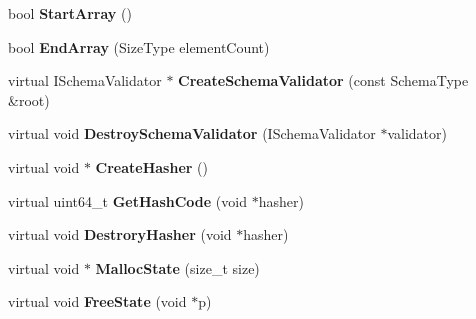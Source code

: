 \begin{DoxyCompactItemize}
\item 
bool {\bfseries Start\+Array} ()\hypertarget{class_generic_schema_validator_aba13751f802531ed8cbd850778ea993c}{}\label{class_generic_schema_validator_aba13751f802531ed8cbd850778ea993c}

\item 
bool {\bfseries End\+Array} (Size\+Type element\+Count)\hypertarget{class_generic_schema_validator_a67b501f0f65d40e0086ca8216882b34f}{}\label{class_generic_schema_validator_a67b501f0f65d40e0086ca8216882b34f}

\item 
virtual I\+Schema\+Validator $\ast$ {\bfseries Create\+Schema\+Validator} (const Schema\+Type \&root)\hypertarget{class_generic_schema_validator_af074f9c8f2cfc07e1b3d3f8862e7ef11}{}\label{class_generic_schema_validator_af074f9c8f2cfc07e1b3d3f8862e7ef11}

\item 
virtual void {\bfseries Destroy\+Schema\+Validator} (I\+Schema\+Validator $\ast$validator)\hypertarget{class_generic_schema_validator_ae24fa298e328f1fd7dda2ef6267156d2}{}\label{class_generic_schema_validator_ae24fa298e328f1fd7dda2ef6267156d2}

\item 
virtual void $\ast$ {\bfseries Create\+Hasher} ()\hypertarget{class_generic_schema_validator_abc377481583ca2095fb784be88887faa}{}\label{class_generic_schema_validator_abc377481583ca2095fb784be88887faa}

\item 
virtual uint64\+\_\+t {\bfseries Get\+Hash\+Code} (void $\ast$hasher)\hypertarget{class_generic_schema_validator_ac01c45982a1f512e1ca06fe5544b0c0f}{}\label{class_generic_schema_validator_ac01c45982a1f512e1ca06fe5544b0c0f}

\item 
virtual void {\bfseries Destrory\+Hasher} (void $\ast$hasher)\hypertarget{class_generic_schema_validator_a007eef58be575dc562543d069ddd2710}{}\label{class_generic_schema_validator_a007eef58be575dc562543d069ddd2710}

\item 
virtual void $\ast$ {\bfseries Malloc\+State} (size\+\_\+t size)\hypertarget{class_generic_schema_validator_a7c999dfb3118aaa08495d60eee6d3732}{}\label{class_generic_schema_validator_a7c999dfb3118aaa08495d60eee6d3732}

\item 
virtual void {\bfseries Free\+State} (void $\ast$p)\hypertarget{class_generic_schema_validator_a4e250737a411af2969a9e585a7da4187}{}\label{class_generic_schema_validator_a4e250737a411af2969a9e585a7da4187}


\end{DoxyCompactItemize}
